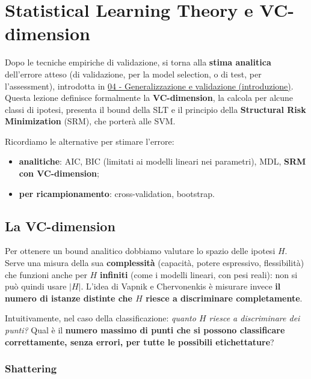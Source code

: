 \chapter{Statistical Learning Theory e VC-dimension}\label{ch-12}

Dopo le tecniche empiriche di validazione, si torna alla \textbf{stima
analitica} dell'errore atteso (di validazione, per la model selection, o
di test, per l'assessment), introdotta in
\href{04\%20-\%20Generalizzazione\%20e\%20validazione\%20(introduzione)}{04
- Generalizzazione e validazione (introduzione)}. Questa lezione
definisce formalmente la \textbf{VC-dimension}, la calcola per alcune
classi di ipotesi, presenta il bound della SLT e il principio della
\textbf{Structural Risk Minimization} (SRM), che porterà alle SVM.

Ricordiamo le alternative per stimare l'errore:

\begin{itemize}
\tightlist
\item
  \textbf{analitiche}: AIC, BIC (limitati ai modelli lineari nei
  parametri), MDL, \textbf{SRM con VC-dimension};
\item
  \textbf{per ricampionamento}: cross-validation, bootstrap.
\end{itemize}

\section{La VC-dimension}\label{la-vc-dimension}

Per ottenere un bound analitico dobbiamo valutare lo spazio delle
ipotesi \(H\). Serve una misura della sua \textbf{complessità}
(capacità, potere espressivo, flessibilità) che funzioni anche per \(H\)
\textbf{infiniti} (come i modelli lineari, con pesi reali): non si può
quindi usare \(|H|\). L'idea di Vapnik e Chervonenkis è misurare invece
\textbf{il numero di istanze distinte che \(H\) riesce a discriminare
completamente}.

Intuitivamente, nel caso della classificazione: \emph{quanto \(H\)
riesce a discriminare dei punti?} Qual è il \textbf{numero massimo di
punti che si possono classificare correttamente, senza errori, per tutte
le possibili etichettature}?

\subsection{Shattering}\label{shattering}

